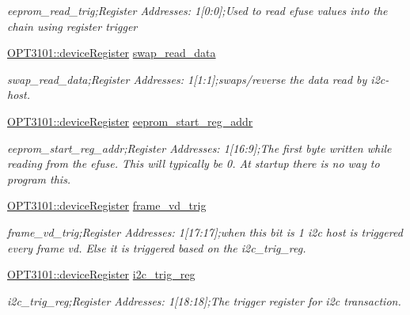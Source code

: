 \begin{DoxyCompactItemize}
\begin{DoxyCompactList}\small\item\em eeprom\+\_\+read\+\_\+trig;Register Addresses\+: 1\mbox{[}0\+:0\mbox{]};Used to read efuse values into the chain using register trigger \end{DoxyCompactList}\item 
\mbox{\hyperlink{class_o_p_t3101_1_1device_register}{O\+P\+T3101\+::device\+Register}} \mbox{\hyperlink{class_o_p_t3101_1_1registers_a23607ef6535360d4ff1264f6249b65c0}{swap\+\_\+read\+\_\+data}}
\begin{DoxyCompactList}\small\item\em swap\+\_\+read\+\_\+data;Register Addresses\+: 1\mbox{[}1\+:1\mbox{]};swaps/reverse the data read by i2c-\/host. \end{DoxyCompactList}\item 
\mbox{\hyperlink{class_o_p_t3101_1_1device_register}{O\+P\+T3101\+::device\+Register}} \mbox{\hyperlink{class_o_p_t3101_1_1registers_acc74ed36bdb89a844459ded9baea62c8}{eeprom\+\_\+start\+\_\+reg\+\_\+addr}}
\begin{DoxyCompactList}\small\item\em eeprom\+\_\+start\+\_\+reg\+\_\+addr;Register Addresses\+: 1\mbox{[}16\+:9\mbox{]};The first byte written while reading from the efuse. This will typically be 0. At startup there is no way to program this. \end{DoxyCompactList}\item 
\mbox{\hyperlink{class_o_p_t3101_1_1device_register}{O\+P\+T3101\+::device\+Register}} \mbox{\hyperlink{class_o_p_t3101_1_1registers_a853a700e44ec7b0eceb21f2c5d03a37a}{frame\+\_\+vd\+\_\+trig}}
\begin{DoxyCompactList}\small\item\em frame\+\_\+vd\+\_\+trig;Register Addresses\+: 1\mbox{[}17\+:17\mbox{]};when this bit is \textquotesingle{}1\textquotesingle{} i2c host is triggered every frame vd. Else it is triggered based on the i2c\+\_\+trig\+\_\+reg. \end{DoxyCompactList}\item 
\mbox{\hyperlink{class_o_p_t3101_1_1device_register}{O\+P\+T3101\+::device\+Register}} \mbox{\hyperlink{class_o_p_t3101_1_1registers_a45c7b0357126b98470aac2dd8d577ddb}{i2c\+\_\+trig\+\_\+reg}}
\begin{DoxyCompactList}\small\item\em i2c\+\_\+trig\+\_\+reg;Register Addresses\+: 1\mbox{[}18\+:18\mbox{]};The trigger register for i2c transaction. \end{DoxyCompactList}\item 

\end{DoxyCompactItemize}
